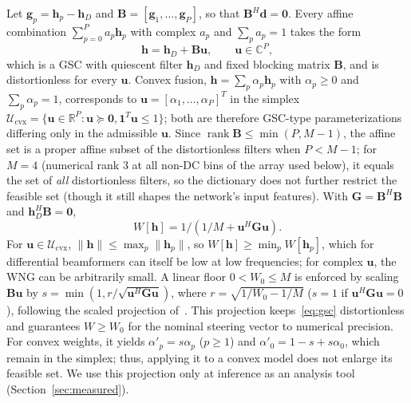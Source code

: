 \documentclass[journal]{IEEEtran}
\begin{document}
Let $\mathbf g_p=\mathbf h_p-\mathbf h_D$ and $\mathbf B=[\mathbf g_1,\dots,\mathbf g_P]$, so that $\mathbf B^H\mathbf d=\mathbf 0$. Every affine combination $\sum_{p=0}^Pa_p\mathbf h_p$ with complex $a_p$ and $\sum_pa_p=1$ takes the form
\begin{equation}
\mathbf h=\mathbf h_D+\mathbf B\mathbf u,\qquad\mathbf u\in\mathbb C^P,
\label{eq:gsc}
\end{equation}
which is a GSC with quiescent filter $\mathbf h_D$ and fixed blocking matrix $\mathbf B$, and is distortionless for every $\mathbf u$. Convex fusion, $\mathbf h=\sum_p\alpha_p\mathbf h_p$ with $\alpha_p\ge0$ and $\sum_p\alpha_p=1$, corresponds to $\mathbf u=[\alpha_1,\dots,\alpha_P]^T$ in the simplex $\mathcal U_{\mathrm{cvx}}=\{\mathbf u\in\mathbb R^P:\mathbf u\succeq\mathbf 0,\mathbf 1^T\mathbf u\le1\}$; both are therefore GSC-type parameterizations differing only in the admissible $\mathbf u$. Since $\operatorname{rank}\mathbf B\le\min(P,M-1)$, the affine set is a proper affine subset of the distortionless filters when $P<M-1$; for $M=4$ (numerical rank 3 at all non-DC bins of the array used below), it equals the set of \emph{all} distortionless filters, so the dictionary does not further restrict the feasible set (though it still shapes the network's input features). With $\mathbf G=\mathbf B^H\mathbf B$ and $\mathbf h_D^H\mathbf B=\mathbf 0$,
\begin{equation}
W[\mathbf h]=1/(1/M+\mathbf u^H\mathbf G\mathbf u).
\label{eq:wng}
\end{equation}
For $\mathbf u\in\mathcal U_{\mathrm{cvx}}$, $\|\mathbf h\|\le\max_p\|\mathbf h_p\|$, so $W[\mathbf h]\ge\min_pW[\mathbf h_p]$, which for differential beamformers can itself be low at low frequencies; for complex $\mathbf u$, the WNG can be arbitrarily small. A linear floor $0<W_0\le M$ is enforced by scaling $\mathbf B\mathbf u$ by $s=\min(1,r/\sqrt{\mathbf u^H\mathbf G\mathbf u})$, where $r=\sqrt{1/W_0-1/M}$ ($s=1$ if $\mathbf u^H\mathbf G\mathbf u=0$), following the scaled projection of~\cite{cox1987robust}. This projection keeps~\eqref{eq:gsc} distortionless and guarantees $W\ge W_0$ for the nominal steering vector to numerical precision. For convex weights, it yields $\alpha'_p=s\alpha_p$ ($p\ge1$) and $\alpha'_0=1-s+s\alpha_0$, which remain in the simplex; thus, applying it to a convex model does not enlarge its feasible set. We use this projection only at inference as an analysis tool (Section~\ref{sec:measured}).
\end{document}
